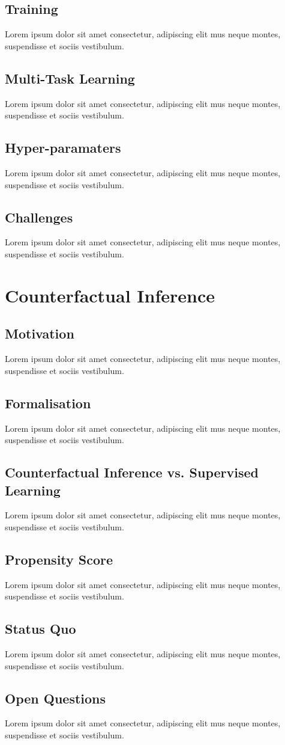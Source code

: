 \subsection{Training}
Lorem ipsum dolor sit amet consectetur, adipiscing elit mus neque montes, suspendisse et sociis vestibulum.

\subsection{Multi-Task Learning}
Lorem ipsum dolor sit amet consectetur, adipiscing elit mus neque montes, suspendisse et sociis vestibulum.

\subsection{Hyper-paramaters}
Lorem ipsum dolor sit amet consectetur, adipiscing elit mus neque montes, suspendisse et sociis vestibulum.

\subsection{Challenges}
Lorem ipsum dolor sit amet consectetur, adipiscing elit mus neque montes, suspendisse et sociis vestibulum.


\section{Counterfactual Inference}
\subsection{Motivation}
Lorem ipsum dolor sit amet consectetur, adipiscing elit mus neque montes, suspendisse et sociis vestibulum.

\subsection{Formalisation}
Lorem ipsum dolor sit amet consectetur, adipiscing elit mus neque montes, suspendisse et sociis vestibulum.

\subsection{Counterfactual Inference vs. Supervised Learning}
Lorem ipsum dolor sit amet consectetur, adipiscing elit mus neque montes, suspendisse et sociis vestibulum.

\subsection{Propensity Score}
Lorem ipsum dolor sit amet consectetur, adipiscing elit mus neque montes, suspendisse et sociis vestibulum.

\subsection{Status Quo}
Lorem ipsum dolor sit amet consectetur, adipiscing elit mus neque montes, suspendisse et sociis vestibulum.

\subsection{Open Questions}
Lorem ipsum dolor sit amet consectetur, adipiscing elit mus neque montes, suspendisse et sociis vestibulum.

